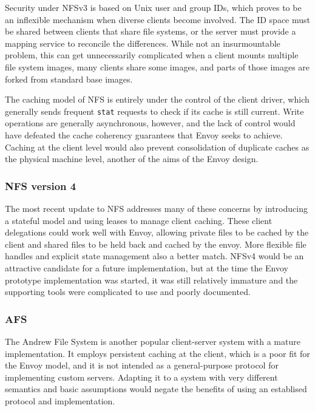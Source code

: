 Security under NFSv3 is based on Unix user and group IDs, which proves to be an inflexible mechanism when diverse clients become involved. The ID space must be shared between clients that share file systems, or the server must provide a mapping service to reconcile the differences. While not an insurmountable problem, this can get unnecessarily complicated when a client mounts multiple file system images, many clients share some images, and parts of those images are forked from standard base images.

The caching model of NFS is entirely under the control of the client driver, which generally sends frequent \texttt{stat} requests to check if its cache is still current. Write operations are generally asynchronous, however, and the lack of control would have defeated the cache coherency guarantees that Envoy seeks to achieve. Caching at the client level would also prevent consolidation of duplicate caches as the physical machine level, another of the aims of the Envoy design.

\subsubsection{NFS version 4}

The most recent update to NFS addresses many of these concerns by introducing a stateful model and using leases to manage client caching. These client delegations could work well with Envoy, allowing private files to be cached by the client and shared files to be held back and cached by the envoy. More flexible file handles and explicit state management also a better match. NFSv4 would be an attractive candidate for a future implementation, but at the time the Envoy prototype implementation was started, it was still relatively immature and the supporting tools were complicated to use and poorly documented.

\subsubsection{AFS}

The Andrew File System is another popular client-server system with a mature implementation. It employs persistent caching at the client, which is a poor fit for the Envoy model, and it is not intended as a general-purpose protocol for implementing custom servers. Adapting it to a system with very different semantics and basic assumptions would negate the benefits of using an establised protocol and implementation.

